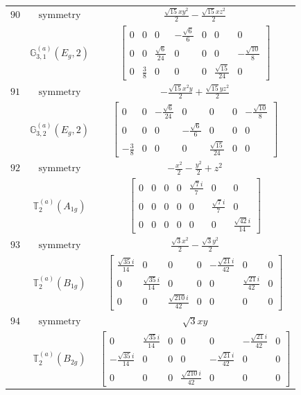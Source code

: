 \documentclass[fleqn,8pt,landscape]{jsarticle}
\begin{document}
\begin{longtable}{ccc}
$ 90 $ & $ \text{symmetry} $ & $ \frac{\sqrt{15} x y^{2}}{2} - \frac{\sqrt{15} x z^{2}}{2} $ \\
$  $ & $ \mathbb{G}_{3,1}^{(a)}(E_{g},2) $ & $ \begin{bmatrix} 0 & 0 & 0 & - \frac{\sqrt{6}}{6} & 0 & 0 & 0 \\ 0 & 0 & \frac{\sqrt{6}}{24} & 0 & 0 & 0 & - \frac{\sqrt{10}}{8} \\ 0 & \frac{3}{8} & 0 & 0 & 0 & \frac{\sqrt{15}}{24} & 0 \end{bmatrix} $ \\ \hline
$ 91 $ & $ \text{symmetry} $ & $ - \frac{\sqrt{15} x^{2} y}{2} + \frac{\sqrt{15} y z^{2}}{2} $ \\
$  $ & $ \mathbb{G}_{3,2}^{(a)}(E_{g},2) $ & $ \begin{bmatrix} 0 & 0 & - \frac{\sqrt{6}}{24} & 0 & 0 & 0 & - \frac{\sqrt{10}}{8} \\ 0 & 0 & 0 & - \frac{\sqrt{6}}{6} & 0 & 0 & 0 \\ - \frac{3}{8} & 0 & 0 & 0 & \frac{\sqrt{15}}{24} & 0 & 0 \end{bmatrix} $ \\ \hline
$ 92 $ & $ \text{symmetry} $ & $ - \frac{x^{2}}{2} - \frac{y^{2}}{2} + z^{2} $ \\
$  $ & $ \mathbb{T}_{2}^{(a)}(A_{1g}) $ & $ \begin{bmatrix} 0 & 0 & 0 & 0 & \frac{\sqrt{7} i}{7} & 0 & 0 \\ 0 & 0 & 0 & 0 & 0 & \frac{\sqrt{7} i}{7} & 0 \\ 0 & 0 & 0 & 0 & 0 & 0 & \frac{\sqrt{42} i}{14} \end{bmatrix} $ \\ \hline
$ 93 $ & $ \text{symmetry} $ & $ \frac{\sqrt{3} x^{2}}{2} - \frac{\sqrt{3} y^{2}}{2} $ \\
$  $ & $ \mathbb{T}_{2}^{(a)}(B_{1g}) $ & $ \begin{bmatrix} \frac{\sqrt{35} i}{14} & 0 & 0 & 0 & - \frac{\sqrt{21} i}{42} & 0 & 0 \\ 0 & \frac{\sqrt{35} i}{14} & 0 & 0 & 0 & \frac{\sqrt{21} i}{42} & 0 \\ 0 & 0 & \frac{\sqrt{210} i}{42} & 0 & 0 & 0 & 0 \end{bmatrix} $ \\ \hline
$ 94 $ & $ \text{symmetry} $ & $ \sqrt{3} x y $ \\
$  $ & $ \mathbb{T}_{2}^{(a)}(B_{2g}) $ & $ \begin{bmatrix} 0 & \frac{\sqrt{35} i}{14} & 0 & 0 & 0 & - \frac{\sqrt{21} i}{42} & 0 \\ - \frac{\sqrt{35} i}{14} & 0 & 0 & 0 & - \frac{\sqrt{21} i}{42} & 0 & 0 \\ 0 & 0 & 0 & \frac{\sqrt{210} i}{42} & 0 & 0 & 0 \end{bmatrix} $ \\ \hline

\end{longtable}
\end{document}
